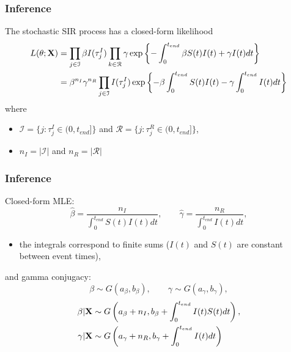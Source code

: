\documentclass{beamer}
\begin{document}
\begin{frame} \frametitle{Inference}  

	The stochastic SIR process has a closed-form likelihood 
	\begin{align*}
		L(\theta; \mathbf{X})
		& = \prod_{j \in \mathcal{I}} \beta I(\tau^I_j) \prod_{k \in \mathcal{R}} \gamma \exp\left\lbrace - \int_{0}^{t_{end}}\beta S(t)I(t) + \gamma I(t) dt \right\rbrace \\
		\label{eq:cdl}
		& = \beta^{n_I} \gamma^{n_R}\prod_{j \in \mathcal{I}} I(\tau^I_j) \exp\left\lbrace - \beta \int_{0}^{t_{end}} S(t)I(t) - \gamma \int_{0}^{t_{end}} I(t) dt \right\rbrace
	\end{align*}
	where
	\begin{itemize}
		\item $\mathcal{I} = \{j: \tau^I_j \in (0, t_{end}]\}$ and $\mathcal{R} = \{j: \tau^R_j \in (0, t_{end}]\}$,
		\item $n_I = |\mathcal{I}|$ and $n_R = |\mathcal{R}|$
	\end{itemize}
			
\end{frame}





\begin{frame} \frametitle{Inference}	
	Closed-form MLE:
	$$
	\hat{\beta} = \dfrac{n_I}{ \int_{0}^{t_{end}} S(t)I(t)dt}, \qquad \hat{\gamma} = \dfrac{n_R}{ \int_{0}^{t_{end}} I(t)dt},
	$$
	\begin{itemize}
		\item the integrals correspond to finite sums ($I(t)$ and $S(t)$ are constant between event times),
	\end{itemize}
	and gamma conjugacy:
	\begin{equation*}
		\beta \sim G(a_{\beta}, b_{\beta}), \qquad \gamma \sim G(a_{\gamma}, b_{\gamma}),
	\end{equation*}
	\begin{align*}
		\beta | \mathbf{X} & \sim G\left( a_{\beta} + n_I , b_{\beta} + \int_{0}^{t_{end}} I(t)S(t) dt\right), \\
		\gamma | \mathbf{X} & \sim G\left( a_{\gamma} + n_R, b_{\gamma} + \int_{0}^{t_{end}} I(t) dt\right)
	\end{align*}

\end{frame}
\end{document}
